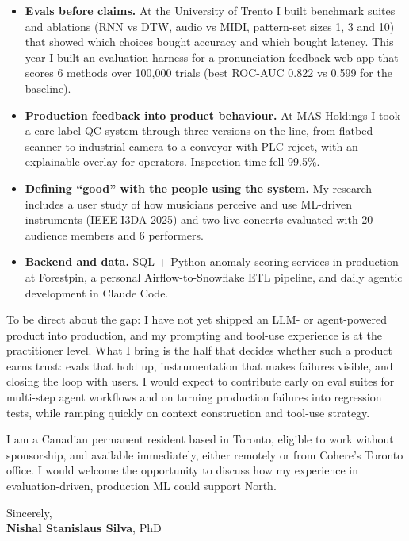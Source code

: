 \documentclass[11pt]{article}
\newcommand{\clName}{Nishal Stanislaus Silva}
\newcommand{\clTeam}{North}
\begin{document}
\begin{itemize}[leftmargin=1.2em, itemsep=0.1em, topsep=0.2em]
    \item \textbf{Evals before claims.} At the University of Trento I built benchmark suites and ablations (RNN vs DTW, audio vs MIDI, pattern-set sizes 1, 3 and 10) that showed which choices bought accuracy and which bought latency. This year I built an evaluation harness for a pronunciation-feedback web app that scores 6 methods over 100,000 trials (best ROC-AUC 0.822 vs 0.599 for the baseline).
    \item \textbf{Production feedback into product behaviour.} At MAS Holdings I took a care-label QC system through three versions on the line, from flatbed scanner to industrial camera to a conveyor with PLC reject, with an explainable overlay for operators. Inspection time fell 99.5\%.
    \item \textbf{Defining ``good'' with the people using the system.} My research includes a user study of how musicians perceive and use ML-driven instruments (IEEE I3DA 2025) and two live concerts evaluated with 20 audience members and 6 performers.
    \item \textbf{Backend and data.} SQL + Python anomaly-scoring services in production at Forestpin, a personal Airflow-to-Snowflake ETL pipeline, and daily agentic development in Claude Code.
\end{itemize}

To be direct about the gap: I have not yet shipped an LLM- or agent-powered product into production, and my prompting and tool-use experience is at the practitioner level. What I bring is the half that decides whether such a product earns trust: evals that hold up, instrumentation that makes failures visible, and closing the loop with users. I would expect to contribute early on eval suites for multi-step agent workflows and on turning production failures into regression tests, while ramping quickly on context construction and tool-use strategy.

I am a Canadian permanent resident based in Toronto, eligible to work without sponsorship, and available immediately, either remotely or from Cohere's Toronto office. I would welcome the opportunity to discuss how my experience in evaluation-driven, production ML could support \clTeam{}.

\vspace{8pt}
Sincerely,\\[2pt]
\textbf{\clName}, PhD
\end{document}
